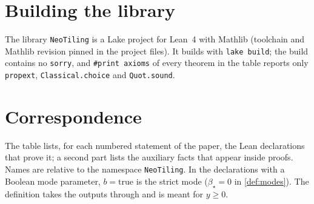 \ECSwitch
{}
\section{Building the library}
The library \texttt{NeoTiling} is a Lake project for Lean~4 with Mathlib (toolchain and Mathlib revision pinned in the project files). It builds with \texttt{lake build}; the build contains no \texttt{sorry}, and \texttt{\#print axioms} of every theorem in the table reports only \texttt{propext}, \texttt{Classical.choice} and \texttt{Quot.sound}. 

\section{Correspondence}
The table lists, for each numbered statement of the paper, the Lean declarations that prove it; a second part lists the auxiliary facts that appear inside proofs. Names are relative to the namespace \texttt{NeoTiling}. In the declarations with a Boolean mode parameter, $b=\mathrm{true}$ is the strict mode ($\beta_\star=0$ in \cref{def:modes}). The definition  takes the outputs through  and is meant for $y\ge0$.

